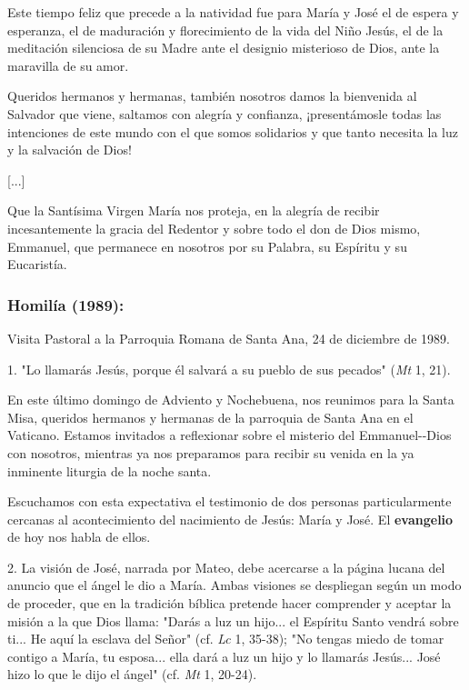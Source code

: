 \begin{body}
\begin{body}
Este tiempo feliz que precede a la natividad fue para María y José el de espera y esperanza, el de maduración y florecimiento de la vida del Niño Jesús, el de la meditación silenciosa de su Madre ante el designio misterioso de Dios, ante la maravilla de su amor.

Queridos hermanos y hermanas, también nosotros damos la bienvenida al Salvador que viene, saltamos con alegría y confianza, ¡presentámosle todas las intenciones de este mundo con el que somos solidarios y que tanto necesita la luz y la salvación de Dios!

{[}...{]}

Que la Santísima Virgen María nos proteja, en la alegría de recibir incesantemente la gracia del Redentor y sobre todo el don de Dios mismo, Emmanuel, que permanece en nosotros por su Palabra, su Espíritu y su Eucaristía.
\end{body} 
	
\subsubsection{Homilía (1989): }

Visita Pastoral a la Parroquia Romana de Santa Ana, 24 de diciembre de 1989.

\begin{body} 
1. "Lo llamarás Jesús, porque él salvará a su pueblo de sus pecados" (\emph{Mt} 1, 21).

En este último domingo de Adviento y Nochebuena, nos reunimos para la Santa Misa, queridos hermanos y hermanas de la parroquia de Santa Ana en el Vaticano. Estamos invitados a reflexionar sobre el misterio del Emmanuel-\/-Dios con nosotros, mientras ya nos preparamos para recibir su venida en la ya inminente liturgia de la noche santa.

Escuchamos con esta expectativa el testimonio de dos personas particularmente cercanas al acontecimiento del nacimiento de Jesús: María y José. El \textbf{evangelio} de hoy nos habla de ellos.

2. La visión de José, narrada por Mateo, debe acercarse a la página lucana del anuncio que el ángel le dio a María. Ambas visiones se despliegan según un modo de proceder, que en la tradición bíblica pretende hacer comprender y aceptar la misión a la que Dios llama: "Darás a luz un hijo... el Espíritu Santo vendrá sobre ti... He aquí la esclava del Señor" (cf. \emph{Lc} 1, 35-38); "No tengas miedo de tomar contigo a María, tu esposa... ella dará a luz un hijo y lo llamarás Jesús... José hizo lo que le dijo el ángel" (cf. \emph{Mt} 1, 20-24).


\end{body}
\end{body}
